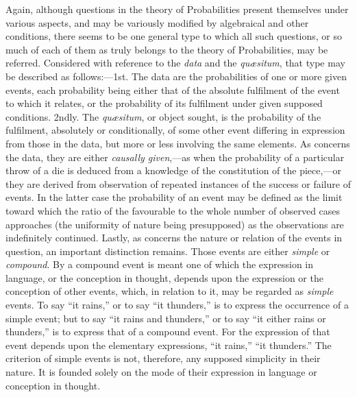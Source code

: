 \documentclass[oneside]{book}
\begin{document}
Again, although questions in the theory of Probabilities
present themselves under various aspects, and may be variously
modified by algebraical and other conditions, there seems to be
one general type to which all such questions, or so much of each
of them as truly belongs to the theory of Probabilities, may be
referred. Considered with reference to the \textit{data} and the \textit{qu\ae{}situm},
that type may be described as follows:---1st. The data are
the probabilities of one or more given events, each probability
being either that of the absolute fulfilment of the event to which
it relates, or the probability of its fulfilment under given supposed
conditions. 2ndly. The \textit{qu\ae{}situm}, or object sought, is the
probability of the fulfilment, absolutely or conditionally, of some
other event differing in expression from those in the data, but
more or less involving the same elements. As concerns the data,
they are either \textit{causally given},---as when the probability of a particular
throw of a die is deduced from a knowledge of the constitution
of the piece,---or they are derived from observation of
repeated instances of the success or failure of events. In the
latter case the probability of an event may be defined as the
limit toward which the ratio of the favourable to the whole number
of observed cases approaches (the uniformity of nature being
presupposed) as the observations are indefinitely continued.
Lastly, as concerns the nature or relation of the events in question,
an important distinction remains. Those events are either
\textit{simple} or \textit{compound}. By a compound event is meant one of
which the expression in language, or the conception in thought,
depends upon the expression or the conception of other events,
which, in relation to it, may be regarded as \textit{simple} events. To
say ``it rains,'' or to say ``it thunders,'' is to express the occurrence
of a simple event; but to say ``it rains and thunders,'' or
to say ``it either rains or thunders,'' is to express that of a compound
event. For the expression of that event depends upon
the elementary expressions, ``it rains,'' ``it thunders.'' The criterion
of simple events is not, therefore, any supposed simplicity
in their nature. It is founded solely on the mode of their expression
in language or conception in thought.
\end{document}
